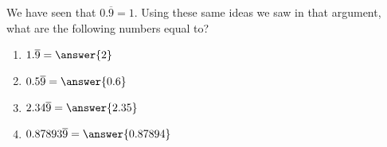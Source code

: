 \documentclass[nooutcomes]{ximera}
\begin{document}
\begin{problem}
 We have seen that $0.\overline{9} = 1$.  Using these same ideas we saw in that argument, what are the following numbers equal to?
 
 \begin{enumerate}
 	\item $1.\overline{9} = \answer{2}$
	\item $0.5\overline{9} = \answer{0.6}$
	\item $2.34\overline{9} = \answer{2.35}$
	\item $0.87893\overline{9} = \answer{0.87894}$
 \end{enumerate}
\end{problem}
\end{document}
